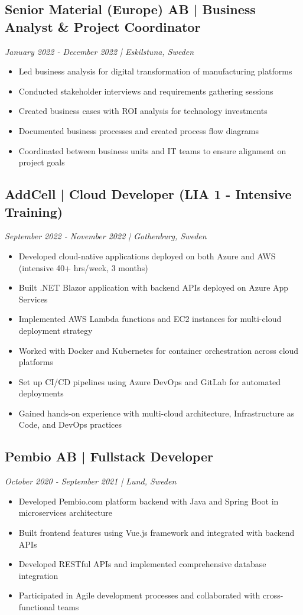 \documentclass[11pt,a4paper]{article}
\begin{document}
\subsection*{Senior Material (Europe) AB | Business Analyst \& Project Coordinator}
\textit{January 2022 - December 2022 | Eskilstuna, Sweden}
\begin{itemize}[noitemsep]
\item Led business analysis for digital transformation of manufacturing platforms
\item Conducted stakeholder interviews and requirements gathering sessions
\item Created business cases with ROI analysis for technology investments
\item Documented business processes and created process flow diagrams
\item Coordinated between business units and IT teams to ensure alignment on project goals
\end{itemize}

\subsection*{AddCell | Cloud Developer (LIA 1 - Intensive Training)}
\textit{September 2022 - November 2022 | Gothenburg, Sweden}
\begin{itemize}[noitemsep]
\item Developed cloud-native applications deployed on both Azure and AWS (intensive 40+ hrs/week, 3 months)
\item Built .NET Blazor application with backend APIs deployed on Azure App Services
\item Implemented AWS Lambda functions and EC2 instances for multi-cloud deployment strategy
\item Worked with Docker and Kubernetes for container orchestration across cloud platforms
\item Set up CI/CD pipelines using Azure DevOps and GitLab for automated deployments
\item Gained hands-on experience with multi-cloud architecture, Infrastructure as Code, and DevOps practices
\end{itemize}

\subsection*{Pembio AB | Fullstack Developer}
\textit{October 2020 - September 2021 | Lund, Sweden}
\begin{itemize}[noitemsep]
\item Developed Pembio.com platform backend with Java and Spring Boot in microservices architecture
\item Built frontend features using Vue.js framework and integrated with backend APIs
\item Developed RESTful APIs and implemented comprehensive database integration
\item Participated in Agile development processes and collaborated with cross-functional teams
\end{itemize}
\end{document}
